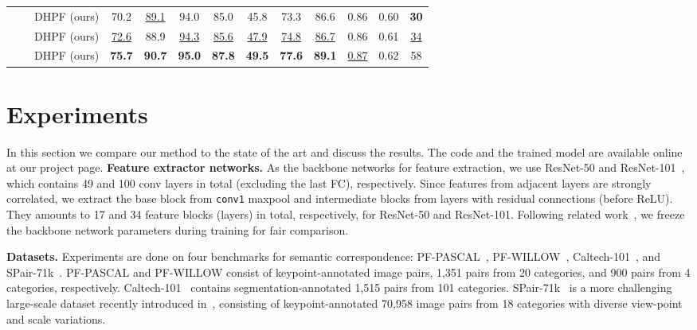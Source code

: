 \documentclass[runningheads]{llncs}
\begin{document}
\begin{table}[!t]
\begin{center}
{\begin{tabular}{cclcccccccccc}
             & & DHPF (ours) & 70.2 & \underline{89.1} & 94.0 & 85.0 & 45.8 & 73.3 & 86.6 & 0.86 & 0.60 & \textbf{30} \\
             
             & & DHPF (ours) & \underline{72.6} & {88.9} & \underline{94.3} & \underline{85.6} & \underline{47.9} & \underline{74.8} & \underline{86.7} & 0.86 & 0.61 & \underline{34} \\
             
             & & DHPF (ours) & \textbf{75.7} &  \textbf{90.7} & \textbf{95.0} & \textbf{87.8} & \textbf{49.5} & \textbf{77.6} & \textbf{89.1} & \underline{0.87} & 0.62 & 58 \\
             
            \bottomrule
    \end{tabular}
    }
    \end{center}
\end{table}

\section{Experiments}

In this section we compare our method to the state of the art and discuss the results. 
The code and the trained model are available online at our project page. 
\smallbreak
\noindent \textbf{Feature extractor networks.} As the backbone networks for feature extraction, we use ResNet-50 and ResNet-101~\cite{he2016deep}, which contains 49 and 100 conv layers in total (excluding the last FC), respectively. Since features from adjacent layers are strongly correlated, we extract the base block from \texttt{conv1} maxpool and intermediate blocks from layers with residual connections (before ReLU). They amounts to 17 and 34 feature blocks (layers) in total, respectively, for ResNet-50 and ResNet-101. Following related work~\cite{choy2016universal,han2017scnet,kim2018recurrent,lee2019sfnet,min2019hyperpixel,rocco17geocnn,rocco18weak,rocco2018neighbourhood,paul2018attentive,huang2019dynamic}, we freeze the backbone network parameters during training for fair comparison.

\smallbreak
\noindent \textbf{Datasets.} Experiments are done on four benchmarks for semantic correspondence: PF-PASCAL~\cite{ham2018proposal}, PF-WILLOW~\cite{ham2016proposal}, Caltech-101~\cite{li2006one}, and SPair-71k~\cite{min2019spair}. PF-PASCAL and PF-WILLOW consist of  keypoint-annotated image pairs, 1,351 pairs from 20 categories, and 900 pairs from 4 categories, respectively. 
Caltech-101~\cite{li2006one} contains  segmentation-annotated 1,515 pairs from 101 categories. SPair-71k~\cite{min2019spair} is a more challenging large-scale dataset recently introduced in~\cite{min2019hyperpixel}, consisting of keypoint-annotated 70,958 image pairs from 18 categories with diverse view-point and scale variations.
\end{document}
